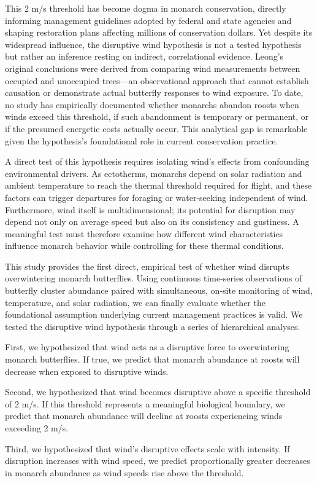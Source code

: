 This 2 m/s threshold has become dogma in monarch conservation, directly informing management guidelines adopted by federal and state agencies and shaping restoration plans affecting millions of conservation dollars. Yet despite its widespread influence, the disruptive wind hypothesis is not a tested hypothesis but rather an inference resting on indirect, correlational evidence. Leong's original conclusions were derived from comparing wind measurements between occupied and unoccupied trees---an observational approach that cannot establish causation or demonstrate actual butterfly responses to wind exposure. To date, no study has empirically documented whether monarchs abandon roosts when winds exceed this threshold, if such abandonment is temporary or permanent, or if the presumed energetic costs actually occur. This analytical gap is remarkable given the hypothesis's foundational role in current conservation practice.

A direct test of this hypothesis requires isolating wind's effects from confounding environmental drivers. As ectotherms, monarchs depend on solar radiation and ambient temperature to reach the thermal threshold required for flight, and these factors can trigger departures for foraging or water-seeking independent of wind. Furthermore, wind itself is multidimensional; its potential for disruption may depend not only on average speed but also on its consistency and gustiness. A meaningful test must therefore examine how different wind characteristics influence monarch behavior while controlling for these thermal conditions.

This study provides the first direct, empirical test of whether wind disrupts overwintering monarch butterflies. Using continuous time-series observations of butterfly cluster abundance paired with simultaneous, on-site monitoring of wind, temperature, and solar radiation, we can finally evaluate whether the foundational assumption underlying current management practices is valid. We tested the disruptive wind hypothesis through a series of hierarchical analyses.

First, we hypothesized that wind acts as a disruptive force to overwintering monarch butterflies. If true, we predict that monarch abundance at roosts will decrease when exposed to disruptive winds.

Second, we hypothesized that wind becomes disruptive above a specific threshold of 2 m/s. If this threshold represents a meaningful biological boundary, we predict that monarch abundance will decline at roosts experiencing winds exceeding 2 m/s.

Third, we hypothesized that wind's disruptive effects scale with intensity. If disruption increases with wind speed, we predict proportionally greater decreases in monarch abundance as wind speeds rise above the threshold.